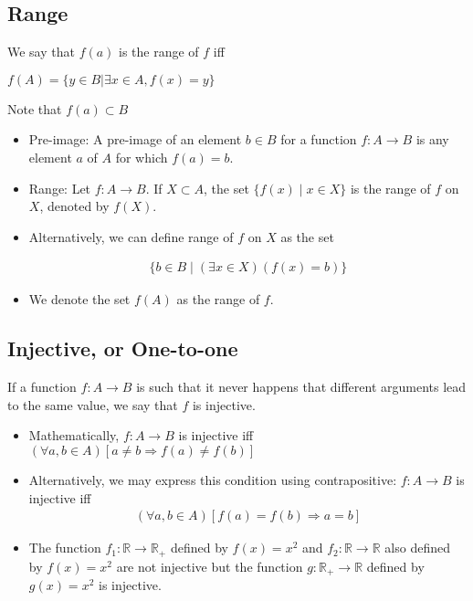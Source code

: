 \documentclass[12pt,a4paper,fleqn]{article}
\begin{document}
  \subsection{Range} 
  We say that \(f(a)\) is the range of \(f\) iff

  \(f(A)=\{y \in B | \exists x \in A, f(x) = y\} \)
  
  Note that \(f(a) \subset B \)

  \begin{itemize}
    \item  Pre-image: A pre-image of an element \(b \in B\) for a function \(f: A \rightarrow B\) is any element \(a\) of \(A\) for which \(f(a)=b\).
    \item Range: Let \(f: A \rightarrow B\). If \(X \subset A\), the set \( \{ f(x) \mid x \in X\} \) is the range of \(f\) on \(X\), denoted by \(f(X)\).
    \item Alternatively, we can define range of \(f\) on \(X\) as the set
    
    \begin{align*}
      \{b \in B \mid(\exists x \in X)(f(x)=b)\}
    \end{align*}
    
    \item We denote the set \(f(A)\) as the range of \(f\).
  \end{itemize}
   \subsection{Injective, or One-to-one} 
   If a function \(f: A \rightarrow B\) is such that it never happens that different arguments lead to the same value, we say that \(f\) is injective.
   \begin{itemize}
       \item Mathematically, \(f: A \rightarrow B\) is injective iff \((\forall a, b \in A)[a \neq b \Rightarrow f(a) \neq f(b)]\)
       
       \item Alternatively, we may express this condition using contrapositive: \(f: A \rightarrow B\) is injective iff
        \begin{align*}
       (\forall a, b \in A)[f(a)=f(b) \Rightarrow a=b]
       \end{align*}

       \item The function \(f_{1}: \mathbb{R} \rightarrow \mathbb{R}_{+}\) defined by \(f(x)=x^2\) and \(f_{2}:\mathbb{R} \to \mathbb{R}\) also defined by \(f(x)=x^2\) are not injective but the function \(g: \mathbb{R}_{+} \rightarrow \mathbb{R}\) defined by \(g(x)=x^2\) is injective.
       \end{itemize}
\end{document}
